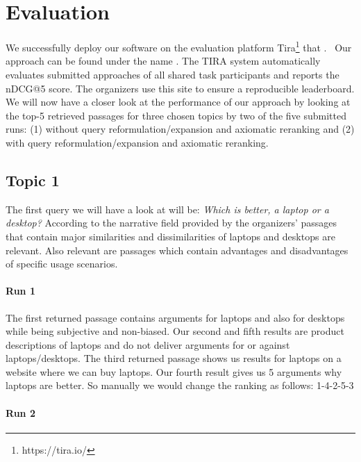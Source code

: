 \section{Evaluation}\label{evaluation}

We successfully deploy our software on the evaluation platform Tira\footnote{https://tira.io/} that .~\todocite
Our approach can be found under the name .
The TIRA system automatically evaluates submitted approaches of all shared task participants and reports the nDCG@5 score.
The organizers use this site to ensure a reproducible leaderboard.
We will now have a closer look at the performance of our approach by looking at the top-5 retrieved passages for three chosen topics by two of the five submitted runs: 
(1) without query reformulation/expansion and axiomatic reranking and
(2) with query reformulation/expansion and axiomatic reranking.

\subsection{Topic 1}

The first query we will have a look at will be: \textit{Which is better, a laptop or a desktop?}
According to the narrative field provided by the organizers' passages that contain major similarities and dissimilarities of laptops and desktops are relevant.
Also relevant are passages which contain advantages and disadvantages of specific usage scenarios.

\paragraph{Run 1}

The first returned passage contains arguments for laptops and also for desktops while being subjective and non-biased.
Our second and fifth results are product descriptions of laptops and do not deliver arguments for or against laptops/desktops.
The third returned passage shows us results for laptops on a website where we can buy laptops.
Our fourth result gives us 5 arguments why laptops are better.
So manually we would  change the ranking as follows: 1-4-2-5-3

\paragraph{Run 2}

